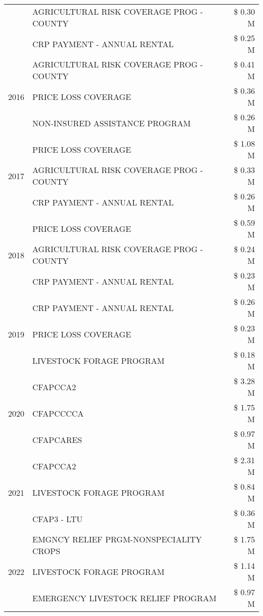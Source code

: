 \begin{tabular}{llr}
 & AGRICULTURAL RISK COVERAGE PROG - COUNTY & \$ 0.30 M \\
 & CRP PAYMENT - ANNUAL RENTAL & \$ 0.25 M \\
\cline{1-3}
\multirow[t]{3}{*}{2016} & AGRICULTURAL RISK COVERAGE PROG - COUNTY & \$ 0.41 M \\
 & PRICE LOSS COVERAGE & \$ 0.36 M \\
 & NON-INSURED ASSISTANCE PROGRAM & \$ 0.26 M \\
\cline{1-3}
\multirow[t]{3}{*}{2017} & PRICE LOSS COVERAGE & \$ 1.08 M \\
 & AGRICULTURAL RISK COVERAGE PROG - COUNTY & \$ 0.33 M \\
 & CRP PAYMENT - ANNUAL RENTAL & \$ 0.26 M \\
\cline{1-3}
\multirow[t]{3}{*}{2018} & PRICE LOSS COVERAGE & \$ 0.59 M \\
 & AGRICULTURAL RISK COVERAGE PROG - COUNTY & \$ 0.24 M \\
 & CRP PAYMENT - ANNUAL RENTAL & \$ 0.23 M \\
\cline{1-3}
\multirow[t]{3}{*}{2019} & CRP PAYMENT - ANNUAL RENTAL & \$ 0.26 M \\
 & PRICE LOSS COVERAGE & \$ 0.23 M \\
 & LIVESTOCK FORAGE PROGRAM & \$ 0.18 M \\
\cline{1-3}
\multirow[t]{3}{*}{2020} & CFAPCCA2 & \$ 3.28 M \\
 & CFAPCCCCA & \$ 1.75 M \\
 & CFAPCARES & \$ 0.97 M \\
\cline{1-3}
\multirow[t]{3}{*}{2021} & CFAPCCA2 & \$ 2.31 M \\
 & LIVESTOCK FORAGE PROGRAM & \$ 0.84 M \\
 & CFAP3 - LTU & \$ 0.36 M \\
\cline{1-3}
\multirow[t]{3}{*}{2022} & EMGNCY RELIEF PRGM-NONSPECIALITY CROPS & \$ 1.75 M \\
 & LIVESTOCK FORAGE PROGRAM & \$ 1.14 M \\
 & EMERGENCY LIVESTOCK RELIEF PROGRAM & \$ 0.97 M \\
\cline{1-3}
\bottomrule
\end{tabular}
